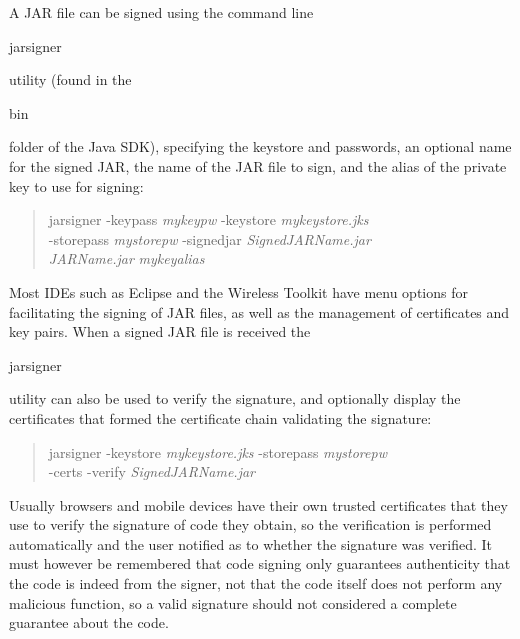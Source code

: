 A JAR file can be signed using the command line \begin{code}jarsigner\end{code} utility
(found in the \begin{code}bin\end{code} folder of the Java SDK), specifying the
keystore and passwords, an optional name for the signed JAR,
the name of the JAR file to sign, and the alias of the private key to use for signing:
\begin{quote}\begin{code}
jarsigner  -keypass \emph{mykeypw} -keystore \emph{mykeystore.jks} \\
\trind -storepass \emph{mystorepw} -signedjar \emph{SignedJARName.jar} \\
\trind \emph{JARName.jar} \emph{mykeyalias}
\end{code}\end{quote}
Most IDEs such as Eclipse and the Wireless Toolkit have menu options for
facilitating the signing of JAR files, as well as the management of certificates and key pairs.
When a signed JAR file is received the \begin{code}jarsigner\end{code} utility
can also be used to verify the signature, and optionally display the certificates that
formed the certificate chain validating the signature:
\begin{quote}\begin{code}
jarsigner -keystore \emph{mykeystore.jks} -storepass \emph{mystorepw} \\
\trind -certs -verify \emph{SignedJARName.jar}
\end{code}\end{quote}
Usually browsers and mobile devices have their own trusted certificates
that they use to verify the signature of code they obtain, so the verification is
performed automatically and the user notified as to whether the signature was verified.
It must however be remembered that code signing only guarantees authenticity that the code
is indeed from the signer, not that the code itself does not perform any malicious function,
so a valid signature should not considered a complete guarantee about the code.


